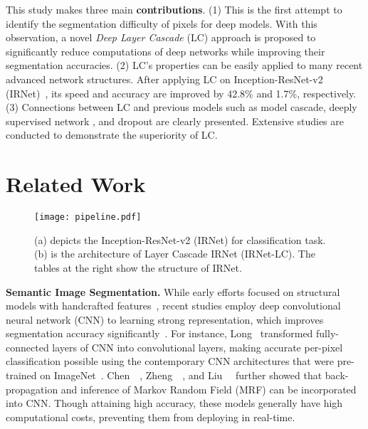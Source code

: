 \documentclass[10pt,twocolumn,letterpaper]{article}
\begin{document}
This study makes three main \textbf{contributions}.
(1) This is the first attempt to identify the segmentation difficulty of pixels for deep models.
With this observation, a novel \emph{Deep Layer Cascade} (LC) approach is proposed to significantly reduce computations of deep networks while improving their segmentation accuracies.
(2) LC's 
properties can be easily applied to many recent advanced network structures.
After applying LC on Inception-ResNet-v2 (IRNet)~\cite{szegedy2016inception}, its speed and accuracy are improved by 42.8\% and 1.7\%, respectively.
(3) Connections between LC and previous models such as model cascade, deeply supervised network \cite{lee2015deeply}, and dropout \cite{srivastava2014dropout} are clearly presented.
Extensive studies are conducted to demonstrate the superiority of LC.



 

\section{Related Work}
\label{sec:related_work}


\begin{figure*}[t]
	\centering
	\texttt{[image: pipeline.pdf]}
	\vskip -0.3cm
	\caption{\small{(a) depicts the Inception-ResNet-v2 (IRNet) for classification task. (b) is the architecture of Layer Cascade IRNet (IRNet-LC). The tables at the right show the structure of IRNet.}}
	\label{fig:model_architecture}
    \vspace{-10pt}
\end{figure*}

\noindent
\textbf{Semantic Image Segmentation.}
While early efforts focused on structural models with handcrafted features~\cite{kae2013augmenting, koltun2011efficient, vineet2012filter, yang2014context}, recent studies employ deep convolutional neural network (CNN) to learning strong representation, which improves segmentation accuracy significantly~\cite{chen2014semantic,liu2015semantic,liu2016deep,long2014fully,zheng2015conditional}.
For instance, Long~\etal \cite{long2014fully} transformed fully-connected layers of CNN into convolutional layers, making accurate per-pixel classification possible using the contemporary CNN architectures that were pre-trained on ImageNet~\cite{deng2009imagenet}.
Chen~\etal~\cite{chen2014semantic}, Zheng~\etal~\cite{zheng2015conditional}, and Liu~\etal~\cite{liu2015semantic,liu2016deep} further showed that back-propagation and inference of Markov Random Field (MRF) can be incorporated into CNN.
Though attaining high accuracy, these models generally have high computational costs, preventing them from deploying in real-time.
\end{document}
